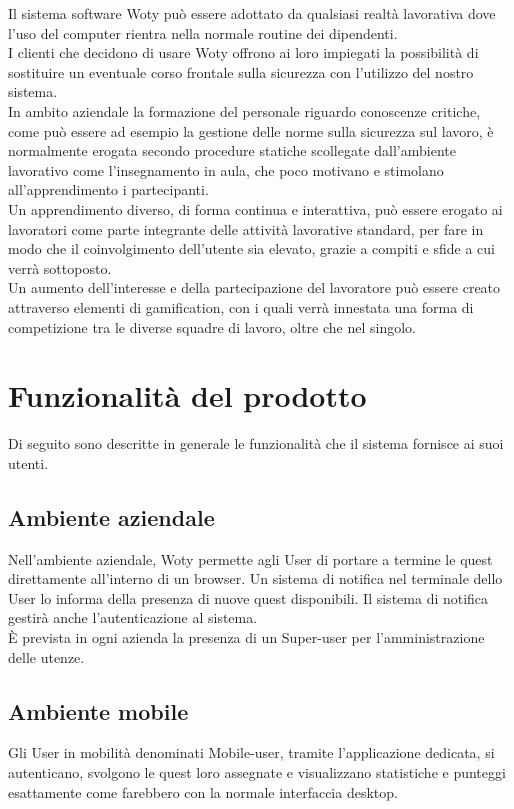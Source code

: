 Il sistema software Woty può essere adottato da qualsiasi realtà lavorativa dove l'uso del computer rientra nella normale routine dei dipendenti.\\
I clienti che decidono di usare Woty offrono ai loro impiegati la possibilità di sostituire un eventuale corso frontale sulla sicurezza con l'utilizzo del nostro sistema.\\
In ambito aziendale la formazione del personale riguardo conoscenze critiche, come può essere ad esempio la gestione delle norme sulla sicurezza sul lavoro, è normalmente erogata secondo procedure statiche scollegate dall'ambiente lavorativo come l'insegnamento in aula, che poco motivano e stimolano all'apprendimento i partecipanti.\\
Un apprendimento diverso, di forma continua e interattiva, può essere erogato ai lavoratori come parte integrante delle attività lavorative standard, per fare in modo che il coinvolgimento dell'utente sia elevato, grazie a compiti e sfide a cui verrà sottoposto.\\
Un aumento dell'interesse e della partecipazione del lavoratore può essere creato attraverso elementi di gamification, con i quali verrà innestata una forma di competizione tra le diverse squadre di lavoro, oltre che nel singolo.


\newpage
\section{Funzionalità del prodotto}

Di seguito sono descritte in generale le funzionalità che il sistema fornisce ai suoi utenti.

\subsection{Ambiente aziendale}
Nell'ambiente aziendale, Woty permette agli User di portare a termine le quest direttamente all'interno di un browser. Un sistema di notifica nel terminale dello User lo informa della presenza di nuove quest disponibili. Il sistema di notifica gestirà anche l'autenticazione al sistema.\\ 
È prevista in ogni azienda la presenza di un Super-user per l'amministrazione delle utenze.


\subsection{Ambiente mobile}
Gli User in mobilità denominati Mobile-user, tramite l'applicazione dedicata, si autenticano, svolgono le quest loro assegnate e visualizzano statistiche e punteggi esattamente come farebbero con la normale interfaccia desktop.

